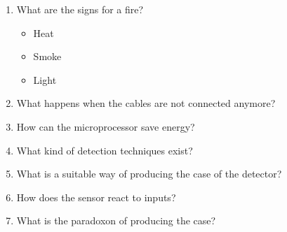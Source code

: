 \begin{enumerate}
    \item What are the signs for a fire? 
    \begin{itemize}
        \item Heat
        \item Smoke
        \item Light
    \end{itemize}
    \item What happens when the cables are not connected anymore?
    \item How can the microprocessor save energy?
    \item What kind of detection techniques exist?
    \item What is a suitable way of producing the case of the detector?
    \item How does the sensor react to inputs?
    \item What is the paradoxon of producing the case?
\end{enumerate}

